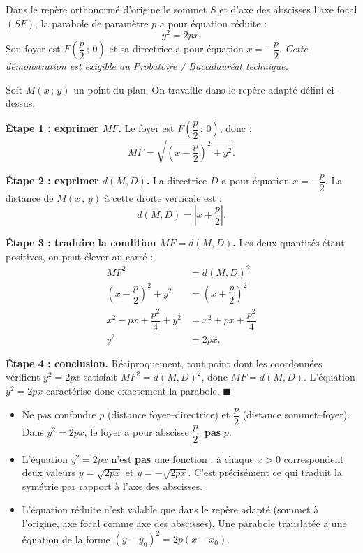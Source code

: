 \documentclass[11pt]{article}
\newcommand{\cle}[1]{{\popxbold\color{popdark}#1}}
\newcounter{popsec}
\newcounter{popsub}
\newcommand{\courssub}[1]{%
  \stepcounter{popsub}%
  \par\vspace{9pt}\noindent{\popxbold\fontsize{11.5}{13}\selectfont\color{popink}{\color{poporange}\thepopsec.\thepopsub}\hspace{6pt}#1}\par\nopagebreak\vspace{4pt}
}
\begin{document}
\courssub{Équation réduite de la parabole}

\begin{propriete}
Dans le repère orthonormé d'origine le sommet $S$ et d'axe des abscisses l'axe focal $(SF)$, la parabole de paramètre $p$ a pour \cle{équation réduite} :
\[ y^2 = 2px. \]
Son foyer est $F\left(\dfrac{p}{2}\,;\,0\right)$ et sa directrice a pour équation $x = -\dfrac{p}{2}$. \emph{Cette démonstration est exigible au Probatoire / Baccalauréat technique.}
\end{propriete}

\begin{experience}
Soit $M(x\,;\,y)$ un point du plan. On travaille dans le repère adapté défini ci-dessus.

\textbf{Étape 1 : exprimer $MF$.} Le foyer est $F\left(\dfrac{p}{2}\,;\,0\right)$, donc :
\[ MF = \sqrt{\left(x-\dfrac{p}{2}\right)^2 + y^2}. \]

\textbf{Étape 2 : exprimer $d(M,D)$.} La directrice $D$ a pour équation $x = -\dfrac{p}{2}$. La distance de $M(x\,;\,y)$ à cette droite verticale est :
\[ d(M,D) = \left|x + \dfrac{p}{2}\right|. \]

\textbf{Étape 3 : traduire la condition $MF = d(M,D)$.} Les deux quantités étant positives, on peut élever au carré :
\begin{align*}
MF^2 &= d(M,D)^2 \\
\left(x-\dfrac{p}{2}\right)^2 + y^2 &= \left(x+\dfrac{p}{2}\right)^2 \\
x^2 - px + \dfrac{p^2}{4} + y^2 &= x^2 + px + \dfrac{p^2}{4} \\
y^2 &= 2px.
\end{align*}

\textbf{Étape 4 : conclusion.} Réciproquement, tout point dont les coordonnées vérifient $y^2 = 2px$ satisfait $MF^2 = d(M,D)^2$, donc $MF = d(M,D)$. L'équation $y^2 = 2px$ caractérise donc exactement la parabole. \hfill$\blacksquare$
\end{experience}

\begin{attention}
\begin{itemize}
\item Ne pas confondre $p$ (distance foyer--directrice) et $\dfrac{p}{2}$ (distance sommet--foyer). Dans $y^2 = 2px$, le foyer a pour abscisse $\dfrac{p}{2}$, \textbf{pas} $p$.
\item L'équation $y^2 = 2px$ n'est \textbf{pas} une fonction : à chaque $x > 0$ correspondent deux valeurs $y = \sqrt{2px}$ et $y = -\sqrt{2px}$. C'est précisément ce qui traduit la symétrie par rapport à l'axe des abscisses.
\item L'équation réduite n'est valable que dans le repère adapté (sommet à l'origine, axe focal comme axe des abscisses). Une parabole translatée a une équation de la forme $(y-y_0)^2 = 2p(x-x_0)$.
\end{itemize}
\end{attention}
\end{document}
